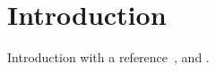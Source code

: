 \chapter{Introduction}\label{ch:introduction}

Introduction with a reference~\citep{Pitt2012c}, \citep{Lovink} and \citep{BuckinghamShum2012}.
